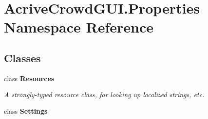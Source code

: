 \hypertarget{namespace_acrive_crowd_g_u_i_1_1_properties}{}\section{Acrive\+Crowd\+G\+U\+I.\+Properties Namespace Reference}
\label{namespace_acrive_crowd_g_u_i_1_1_properties}
\subsection*{Classes}
\begin{DoxyCompactItemize}
\item 
class {\bfseries Resources}
\begin{DoxyCompactList}\small\item\em A strongly-\/typed resource class, for looking up localized strings, etc. \end{DoxyCompactList}\item 
class {\bfseries Settings}
\end{DoxyCompactItemize}
